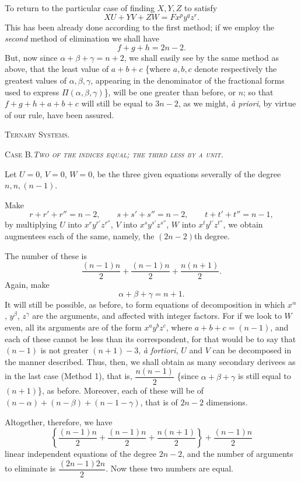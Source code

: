 \documentclass[11pt]{article}
\newcommand{\sourcepage}[1]{\marginpar{\scriptsize p.~#1}}
\begin{document}
To return to the particular case of finding $X,Y,Z$ to satisfy
\[
 XU+YV+ZW=Fx^p y^q z^r.
\]
This has been already done according to the first method; if we employ the \emph{second} method of elimination we shall have
\[
 f+g+h=2n-2.
\]
But, now since $\alpha+\beta+\gamma=n+2$, we shall easily see by the same method as above, that the least value of $a+b+c$ \{where $a,b,c$ denote respectively the greatest values of $\alpha,\beta,\gamma$, appearing in the denominator of the fractional forms used to express $\Pi(\alpha,\beta,\gamma)$\}, will be one greater than before, or $n$; so that $f+g+h+a+b+c$ will still be equal to $3n-2$, as we might, \emph{\`a priori}, by virtue of our rule, have been assured.

\begin{center}\scshape Ternary Systems.\end{center}

\begin{center}\scshape Case B.\quad \emph{Two of the indices equal; the third less by a unit.}\end{center}

Let $U=0$, $V=0$, $W=0$, be the three given equations severally of the degree $n,n,(n-1)$.

\sourcepage{84}
Make
\[
 r+r'+r''=n-2,
 \qquad s+s'+s''=n-2,
 \qquad t+t'+t''=n-1,
\]
by multiplying $U$ into $x^r y^{r'}z^{r''}$, $V$ into $x^s y^{s'}z^{s''}$, $W$ into $x^t y^{t'}z^{t''}$, we obtain augmentees each of the same, namely, the $(2n-2)$th degree.

The number of these is
\[
 \frac{(n-1)n}{2}+\frac{(n-1)n}{2}+\frac{n(n+1)}{2}.
\]
Again, make
\[
 \alpha+\beta+\gamma=n+1.
\]
It will still be possible, as before, to form equations of decomposition in which $x^\alpha$, $y^\beta$, $z^\gamma$ are the arguments, and affected with integer factors. For if we look to $W$ even, all its arguments are of the form $x^a y^b z^c$, where $a+b+c=(n-1)$, and each of these cannot be less than its correspondent, for that would be to say that $(n-1)$ is not greater $(n+1)-3$, \emph{\`a fortiori}, $U$ and $V$ can be decomposed in the manner described. Thus, then, we shall obtain as many secondary derivees as in the last case (Method 1), that is, $\dfrac{n(n-1)}{2}$ \{since $\alpha+\beta+\gamma$ is still equal to $(n+1)$\}, as before. Moreover, each of these will be of $(n-\alpha)+(n-\beta)+(n-1-\gamma)$, that is of $2n-2$ dimensions.

Altogether, therefore, we have
\[
 \left\{\frac{(n-1)n}{2}+\frac{(n-1)n}{2}+\frac{n(n+1)}{2}\right\}+\frac{(n-1)n}{2}
\]
linear independent equations of the degree $2n-2$, and the number of arguments to eliminate is $\dfrac{(2n-1)2n}{2}$. Now these two numbers are equal.
\end{document}

